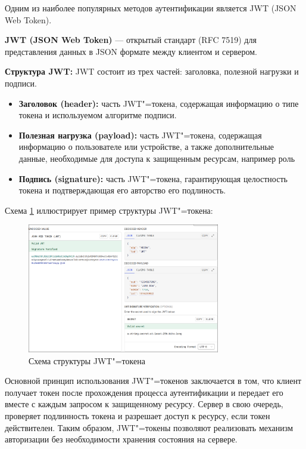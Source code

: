 Одним из наиболее популярных методов аутентификации является JWT (JSON Web Token).

\textbf{JWT (JSON Web Token)} --- открытый стандарт (RFC 7519) для представления данных в JSON формате между клиентом и сервером.


\textbf{Структура JWT:} JWT состоит из трех частей: заголовка, полезной нагрузки и подписи.
\begin{itemize}
	\item{\textbf{Заголовок (header):} часть JWT"=токена, содержащая информацию о типе токена и используемом алгоритме подписи.}
	\item{\textbf{Полезная нагрузка (payload):} часть JWT"=токена, содержащая информацию о пользователе или устройстве, а также дополнительные данные, необходимые для доступа к защищенным ресурсам, например роль}
	\item{\textbf{Подпись (signature):} часть JWT"=токена, гарантирующая целостность токена и подтверждающая его авторство его подлиность.}
\end{itemize}

Схема \ref{fig:JWT} иллюстрирует пример структуры JWT"=токена:

\begin{figure}[!h]
    \centering
    \includegraphics[width = 0.75\textwidth]{imgs/theoryJWT.png}
    \caption{Схема структуры JWT"=токена}
    \label{fig:JWT}
\end{figure}

Основной принцип использования JWT"=токенов заключается в том, что клиент получает токен после прохождения процесса аутентификации и передает его вместе с каждым запросом к защищенному ресурсу. Сервер в свою очередь, проверяет подлинность токена и разрешает доступ к ресурсу, если токен действителен. Таким образом, JWT"=токены позволяют реализовать механизм авторизации без необходимости хранения состояния на сервере. \cite{jwt2}

